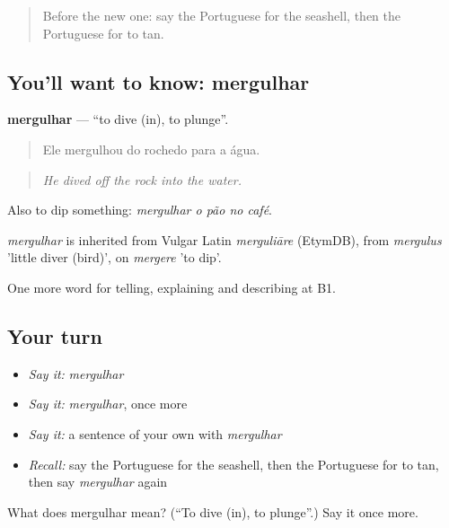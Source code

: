 \label{lesson:PT-C459-mergulhar}



\begin{quote}
Before the new one: say the Portuguese for the seashell, then the Portuguese for to tan.
\end{quote}

\subsection*{You'll want to know: mergulhar}
\textbf{mergulhar} — \textquotedblleft{}to dive (in), to plunge\textquotedblright{}.

\begin{quote}
Ele mergulhou do rochedo para a água.
\end{quote}

\begin{quote}
\emph{He dived off the rock into the water.}
\end{quote}

Also to dip something: \emph{mergulhar o pão no café}.

\begin{cousinweb}
\emph{mergulhar} is inherited from Vulgar Latin \emph{merguliāre} (EtymDB), from \emph{mergulus} 'little diver (bird)', on \emph{mergere} 'to dip'.
\end{cousinweb}

\begin{grammarlens}[title={What you've built}]
One more word for telling, explaining and describing at B1.
\end{grammarlens}

\subsection*{Your turn}
\begin{itemize}
\raggedright
  \item \emph{Say it:} \emph{mergulhar}
  \item \emph{Say it:} \emph{mergulhar}, once more
  \item \emph{Say it:} a sentence of your own with \emph{mergulhar}
  \item \emph{Recall:} say the Portuguese for the seashell, then the Portuguese for to tan, then say \emph{mergulhar} again
\end{itemize}

\begin{tcolorbox}[breakable,colback=teal!4,colframe=teal!35!black,title={Before you move on}]
What does mergulhar mean? (\textquotedblleft{}To dive (in), to plunge\textquotedblright{}.) Say it once more.
\end{tcolorbox}
